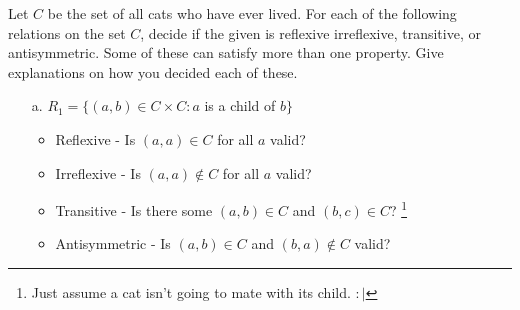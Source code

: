 \documentclass[a4paper,12pt]{book}
\newcounter{question}
\begin{document}
    \begin{questionNOGRADE}{\thequestion}

        Let $C$ be the set of all cats who have ever lived. For each of the
        following relations on the set $C$, decide if the given is
        reflexive irreflexive, transitive, or antisymmetric.
        Some of these can satisfy more than one property. Give
        explanations on how you decided each of these.

        \begin{itemize}
            \item[a.]   $R_{1} = \{ (a, b) \in C \times C : a$ is a child of $b \}$

                \begin{itemize}
                    \item   Reflexive - Is $(a,a) \in C$ for all $a$ valid?

                    \item   Irreflexive - Is $(a,a) \not\in C$ for all $a$ valid?

                    \item   Transitive - Is there some $(a,b) \in C$ and $(b,c) \in C$?
                            \footnote{Just assume a cat isn't going to mate with its child. $:|$}

                    \item   Antisymmetric - Is $(a,b) \in C$ and $(b,a) \not\in C$ valid?
                \end{itemize}


\end{itemize}
\end{questionNOGRADE}
\end{document}
